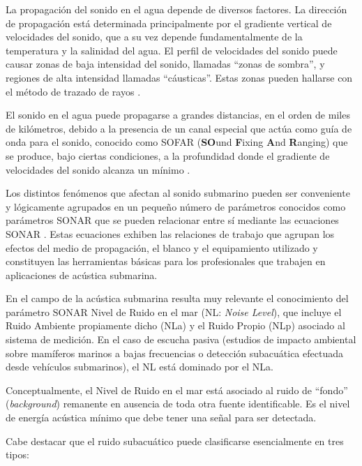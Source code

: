 La propagación del sonido en el agua depende de diversos factores.  La dirección de propagación está determinada principalmente por el gradiente vertical de velocidades del sonido, que a su vez depende fundamentalmente de la temperatura y la salinidad del agua.  El perfil de velocidades del sonido puede causar zonas de baja intensidad del sonido, llamadas ``zonas de sombra'', y regiones de alta intensidad llamadas ``cáusticas''. Estas zonas pueden hallarse con el método de trazado de rayos \citep{tappert1977parabolic}.

El sonido en el agua puede propagarse a grandes distancias, en el orden de miles de kilómetros, debido a la presencia de un canal especial que actúa como guía de onda para el sonido, conocido como SOFAR (\textbf{SO}und \textbf{F}ixing \textbf{A}nd \textbf{R}anging) que se produce, bajo ciertas condiciones, a la profundidad donde el gradiente de velocidades del sonido alcanza un mínimo \citep{medwin1997fundamentals}. 

Los distintos fenómenos que afectan al sonido submarino pueden ser conveniente y lógicamente agrupados en un pequeño número de parámetros conocidos como parámetros SONAR que se pueden relacionar entre sí mediante las ecuaciones SONAR \citep{urick1975principles}.  Estas ecuaciones exhiben las relaciones de trabajo que agrupan los efectos del medio de propagación, el blanco y el equipamiento utilizado y constituyen las herramientas básicas para los profesionales que trabajen en aplicaciones de acústica submarina. 

En el campo de la acústica submarina resulta muy relevante el conocimiento del parámetro SONAR Nivel de Ruido en el mar (NL: \textit{Noise Level}), que incluye el Ruido Ambiente propiamente dicho (NLa) y el Ruido Propio (NLp) asociado al sistema de medición. En el caso de escucha pasiva (estudios de impacto ambiental sobre mamíferos marinos a bajas frecuencias o detección subacuática efectuada desde vehículos submarinos), el NL está dominado por el NLa.

Conceptualmente, el Nivel de Ruido en el mar está asociado al ruido de ``fondo'' (\textit{background}) remanente en ausencia de toda otra fuente identificable. Es el nivel de energía acústica mínimo que debe tener una señal para ser detectada.

Cabe destacar que el ruido subacuático puede clasificarse esencialmente en tres tipos:

